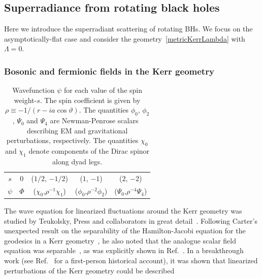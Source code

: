 \documentclass[11pt]{article}
\numberwithin{equation}{section} %
\begin{document}
\subsection{Superradiance from rotating black holes}

Here we introduce the superradiant scattering of rotating BHs. We focus on the asymptotically-flat case and consider the geometry~\eqref{metricKerrLambda} with $\Lambda=0$.

\subsubsection{Bosonic and fermionic fields in the Kerr geometry}\label{sec:Teukolsky}
%
\begin{table}[htb]
\centering \caption{Wavefunction $\psi$ for each value of the spin weight-$s$. The spin coefficient is given by 
$\rho\equiv-1/(r-ia\cos\vartheta)$. The quantities $\phi_0$, $\phi_2$, $\Psi_0$ and $\Psi_4$ are Newman-Penrose 
scalars~\cite{Newman:1961qr} describing EM and gravitational perturbations, respectively. The quantities $\chi_0$ and 
$\chi_1$ denote components of the Dirac spinor along dyad legs.} 
\vskip 12pt
\begin{tabular}{|c|| c c c c |}
\hline%
$s$      & 0  & ($1/2$, $-1/2$) & ($1$, $-1$) & ($2$, $-2$)\\
$\psi$  & $\Phi$  & ($\chi_0$,$\rho^{-1}\chi_1$)	&($\phi_0$,$\rho^{-2}\phi_2$) &($\Psi_0$,$\rho^{-4}\Psi_4$)\\
\hline
\end{tabular}
\label{tab:NP_scalars}
\end{table}
%
The wave equation for linearized fluctuations around the Kerr geometry was studied by Teukolsky, Press and collaborators in great detail~\cite{Teukolsky:1972my,Teukolsky:1973ha,Teukolsky:1974yv,Press:1973zz}. 
Following Carter's unexpected result on the separability of the Hamilton-Jacobi equation for the geodesics in a Kerr 
geometry~\cite{Carter:1968rr}, he also noted that the analogue scalar field equation was separable~\cite{Carter:1968ks}, 
as was explicitly shown in Ref.~\cite{Brill:1972xj}. In a breakthrough work (see Ref.~\cite{Teukolsky:2014vca} for a 
first-person historical account), it was shown that linearized perturbations of the Kerr geometry could be described 
\end{document}
